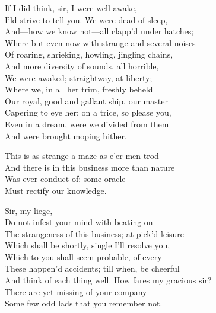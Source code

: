 \begin{verse_speech}[Boatswain] 
If I did think, sir, I were well awake,\\
I'ld strive to tell you. We were dead of sleep,\\
And—how we know not—all clapp'd under hatches;\\
Where but even now with strange and several noises\\
Of roaring, shrieking, howling, jingling chains,\\
And more diversity of sounds, all horrible,\\
We were awaked; straightway, at liberty;\\
Where we, in all her trim, freshly beheld\\
Our royal, good and gallant ship, our master\\
Capering to eye her: on a trice, so please you,\\
Even in a dream, were we divided from them\\
And were brought moping hither.
\end{verse_speech}



\begin{verse_speech}[Alonso] 
This is as strange a maze as e'er men trod\\
And there is in this business more than nature\\
Was ever conduct of: some oracle\\
Must rectify our knowledge.
\end{verse_speech}

\begin{verse_speech}[Prospero] 
Sir, my liege,\\
Do not infest your mind with beating on\\
The strangeness of this business; at pick'd leisure\\
Which shall be shortly, single I'll resolve you,\\
Which to you shall seem probable, of every\\
These happen'd accidents; till when, be cheerful\\
And think of each thing well.
How fares my gracious sir?\\
There are yet missing of your company\\
Some few odd lads that you remember not.
\end{verse_speech}

